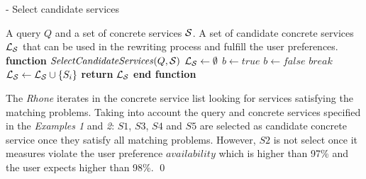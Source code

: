 \begin{algorithm}
\caption{ - Select candidate services}
\label{selectingservices}
\begin{algorithmic}[1]
\REQUIRE A query $Q$ and a set of concrete services $\hbox{${\cal S}$}$.
\ENSURE A set of candidate concrete services $\hbox{${\cal L_{S}}$}$ that can be used in the rewriting process and fulfill the user preferences.
\STATE \textbf{function} $\mathit{SelectCandidateServices} (Q, \hbox{${\cal S}$})$
\STATE $\hbox{${\cal L_{S}}$} \leftarrow \emptyset$
		\STATE $b \leftarrow \mathit{true}$		
				\STATE $b \leftarrow \mathit{false}$	
				\STATE $\mathit{break}$
			\ENDIF
		\ENDFOR
			\STATE $\hbox{${\cal L_{S}}$} \leftarrow \hbox{${\cal L_{S}}$} \cup \lbrace S_{i} \rbrace$	
		\ENDIF
	\ENDIF
\ENDFOR
\STATE \textbf{return} $\hbox{${\cal L_{S}}$}$
\STATE \textbf{end function}
\end{algorithmic}
\end{algorithm}

\begin{example}
The \textit{Rhone} iterates in the concrete service list looking for services satisfying the matching problems.
Taking into account the query and concrete services specified in the \textit{Examples 1} and \textit{2}:  
$S1$, $S3$, $S4$ and $S5$ are selected as candidate concrete service once they satisfy all matching problems. However, $S2$ is not select once it measures violate the user preference $availability$ which is higher than 97\% and the user expects higher than 98\%.
\qed
\end{example}



